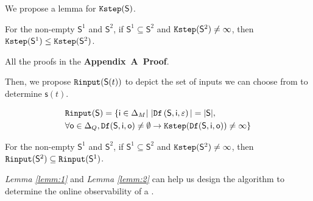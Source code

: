 We propose a lemma for ${\tt Kstep}(\mathsf{S})$.

\begin{lemma}
For the non-empty $\mathsf{S}^{1}$ and $\mathsf{S}^{2}$, if $\mathsf{S}^{1}\subseteq\mathsf{S}^{2}$ and ${\tt Kstep}(\mathsf{S}^{2})\ne\infty$, then ${\tt Kstep}(\mathsf{S}^{1})\le{\tt Kstep}(\mathsf{S}^{2})$.%
  \label{lemm:1}
\end{lemma}

All the proofs in the {\bf Appendix~A~Proof}. 

Then, we propose ${\tt Rinput}(\mathsf{S}(t))$ to depict the set of inputs we can choose from to determine $\mathsf{s}(t)$.

\begin{definition}[$\Ri(\mathsf{S})$] 
\begin{equation*}
\begin{split}
&{\tt Rinput}(\mathsf{S})=\{\mathsf{i}\in \Delta_M|\  |{\tt Df}\left(\mathsf{S},\mathsf{i},\varepsilon\right)|=|\mathsf{S}|, \\
& \forall \mathsf{o} \in \Delta_Q, {\tt Df}(\mathsf{S},\mathsf{i},\mathsf{o})\ne \emptyset \rightarrow {\tt Kstep}({\tt Df}(\mathsf{S},\mathsf{i},\mathsf{o}))\ne \infty\}
\end{split}
\end{equation*}
\end{definition}
\begin{lemma}
For the non-empty $\mathsf{S}^{1}$ and $\mathsf{S}^{2}$, if $\mathsf{S}^{1}\subseteq\mathsf{S}^{2}$ and ${\tt Kstep}(\mathsf{S}^{2})\ne\infty$, then ${\tt Rinput}(\mathsf{S}^2)\subseteq{\tt Rinput}(\mathsf{S}^1)$.
\label{lemm:2}
\end{lemma}

{\em Lemma \ref{lemm:1}} and {\em Lemma \ref{lemm:2}} can help us design the algorithm to determine the online observability of a \BCN.%

